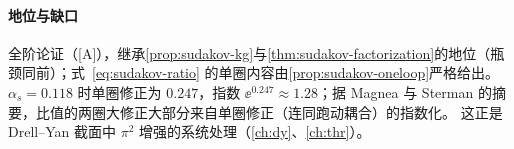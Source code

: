 \paragraph{地位与缺口}全阶论证（[A]），继承\cref{prop:sudakov-kg}与\cref{thm:sudakov-factorization}的地位（瓶颈同前）；式~\eqref{eq:sudakov-ratio} 的单圈内容由\cref{prop:sudakov-oneloop}严格给出。
$\alpha_s=0.118$ 时单圈修正为 $0.247$，指数 $\ee^{0.247}\approx1.28$；据 Magnea 与 Sterman 的摘要，比值的两圈大修正大部分来自单圈修正（连同跑动耦合）的指数化\cite{Magnea:1990zb}。
这正是 Drell--Yan 截面中 $\pi^2$ 增强的系统处理（\cref{ch:dy}、\cref{ch:thr}）。
